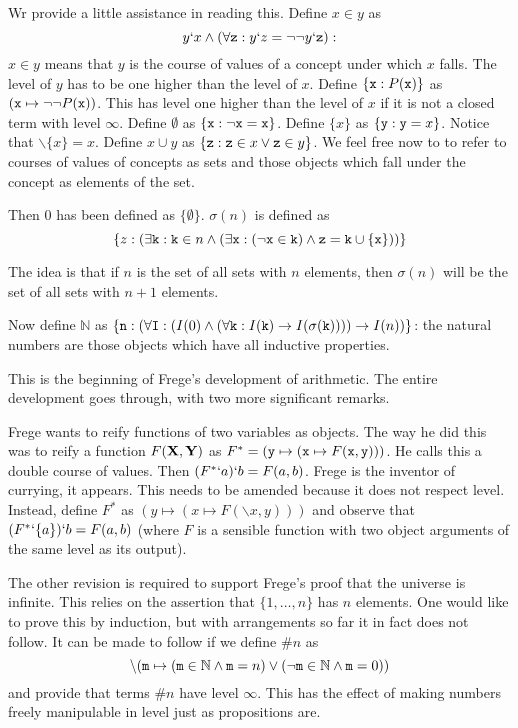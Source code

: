 \documentclass[12pt]{article}
\begin{document}
Wr provide a little assistance in reading this.  Define $x \in y$ as $$y`x \wedge (\forall {\tt z}:y`z = \neg\neg y`{\tt z}):$$  $x \in y$ means that $y$ is the course of values of a concept under which $x$ falls.  The level of $y$ has to be one higher than the level of $x$.
Define $\{{\tt x}:P({\tt x})\}$ as $({\tt x} \mapsto \neg\neg P({\tt x}))$.  This has level one higher than the level of $x$ if it is not a closed term with level $\infty$.   Define $\emptyset$ as $\{{\tt x}:\neg {\tt x} = {\tt x}\}$.    Define $\{x\}$ as $\{{\tt y}:{\tt y}=x\}$. Notice that $\backslash \{x\} = x$.   Define $x \cup y$ as
$\{{\tt z}:{\tt z} \in x \vee {\tt z}\in y\}$.  We feel free now to to refer to courses of values of concepts as sets and those objects which fall under the concept as elements of the set.

Then 0 has been defined as $\{\emptyset\}$.  $\sigma(n)$ is defined as $$\{z : (\exists {\tt k}:{\tt k} \in n \wedge (\exists {\tt x}: (\neg {\tt x} \in {\tt k}) \wedge {\tt z} = {\tt k} \cup \{{\tt x}\}))\}$$

The idea is that if $n$ is the set of all sets with $n$ elements, then $\sigma(n)$ will be the set of all sets with $n+1$ elements.

Now define $\mathbb N$ as $\{{\tt n}:(\forall {\tt I}:(I(0) \wedge (\forall {\tt k}:I({\tt k}) \rightarrow I(\sigma({\tt k}))))\rightarrow I(n))\}$:  the natural numbers are those objects which have all inductive properties.

This is the beginning of Frege's development of arithmetic. The entire development goes through, with two more significant remarks.

Frege wants to reify functions of two variables as objects.  The way he did this was to reify a function $F({\bf X},{\bf Y})$ as $F^* =({\tt y} \mapsto ({\tt x} \mapsto F({\tt x},{\tt y})))$.  He calls this a double course of values.  Then $(F^*`a)`b = F(a,b)$.  Frege is the inventor of currying, it appears.  This needs to be amended because it does not respect level.
  Instead, define $F^*$ as $(y \mapsto(x \mapsto F(\backslash x,y)))$ and observe that $(F^*`\{a\})`b = F(a,b)$ (where $F$ is a sensible function with two object arguments of the same level as its output).

The other revision is required to support Frege's proof that the universe is infinite.  This relies on the assertion that $\{1,\ldots,n\}$ has $n$ elements.  One would like to prove this by induction, but with arrangements so far it in fact does not follow.  It can be made to follow if we define $\#n$ as $$\backslash({\tt m} \mapsto ({\tt m} \in {\mathbb N} \wedge {\tt m}=n) \vee (\neg{\tt m} \in {\mathbb N} \wedge {\tt m}=0))$$  and provide that
terms $\#n$ have level $\infty$.  This has the effect of making numbers freely manipulable in level just as propositions are.
\end{document}
